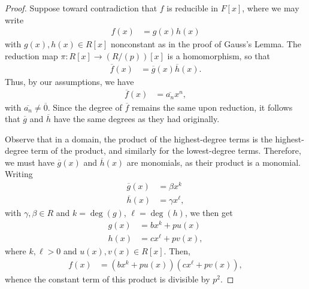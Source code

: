 \documentclass[10pt]{mypackage}
\begin{document}
\begin{proof}
  Suppose toward contradiction that $f$ is reducible in $F[x]$, where we may write
  \begin{align*}
    f(x) &= g(x)h(x)
  \end{align*}
  with $g(x),h(x)\in R[x]$ nonconstant as in the proof of Gauss's Lemma. The reduction map $\pi\colon R[x]\rightarrow \left( R/\left( p \right) \right)[x]$ is a homomorphism, so that
  \begin{align*}
    \overline{f}(x) &= \overline{g}(x) \overline{h}(x).
  \end{align*}
  Thus, by our assumptions, we have
  \begin{align*}
    \overline{f}(x) &= \overline{a_n}x^{n},
  \end{align*}
  with $ \overline{a_n}\neq \overline{0} $. Since the degree of $ \overline{f} $ remains the same upon reduction, it follows that $ \overline{g} $ and $ \overline{h} $ have the same degrees as they had originally.\newline

  Observe that in a domain, the product of the highest-degree terms is the highest-degree term of the product, and similarly for the lowest-degree terms. Therefore, we must have $ \overline{g}(x) $ and $ \overline{h}(x) $ are monomials, as their product is a monomial. Writing
  \begin{align*}
  \overline{g}(x) &= \beta x^{k}\\
  \overline{h}(x) &= \gamma x^{\ell},
  \end{align*}
  with $\gamma,\beta\in R$ and $k = \deg(g)$, $\ell = \deg(h)$, we then get
  \begin{align*}
    g(x) &= bx^{k} + p u(x)\\
    h(x) &= cx^{\ell} + p v(x),
  \end{align*}
  where $k,\ell > 0$ and $u(x),v(x)\in R[x]$. Then,
  \begin{align*}
    f(x) &= \left( bx^{k} + pu(x) \right)\left( cx^{\ell} + pv(x) \right),
  \end{align*}
  whence the constant term of this product is divisible by $p^2$.
\end{proof}
\end{document}
